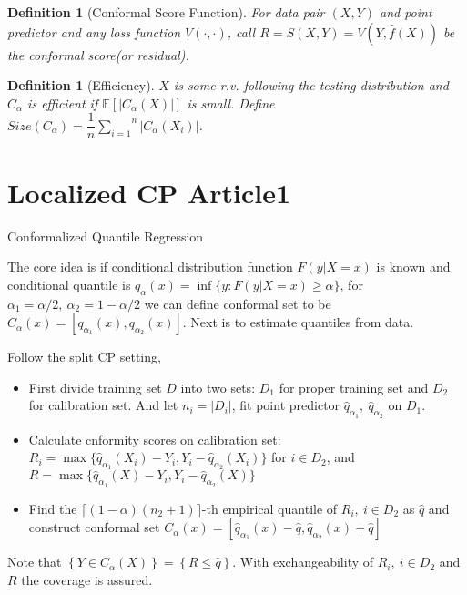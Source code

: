 \documentclass[12pt, a4paper, oneside]{article}
\newtheorem{definition}[theorem]{Definition}
\begin{document}
    \begin{definition}[Conformal Score Function]
        For data pair $(X,Y)$ and point predictor and any loss function $V(\cdot,\cdot)$, call $R=S(X,Y)=V(Y,\hat{f}(X))$ be the conformal score(or residual).
    \end{definition}


    \begin{definition}[Efficiency]
        $X$ is some r.v. following the testing distribution and $C_\alpha$ is efficient if $\mathbb{E}\left[ |C_\alpha(X)| \right]$ is small. Define $Size(C_\alpha)=\dfrac{1}{n}\overset{n}{\underset{i=1}\sum}|C_\alpha(X_i)|$.
    \end{definition}


\section{Localized CP Article1}
    Conformalized Quantile Regression
    \cite{romano2019conformalized}


    The core idea is if conditional distribution function $F(y|X=x)$ is known and conditional quantile is $q_\alpha(x)=\inf\{y:F(y|X=x)\geq\alpha\}$, for $\alpha_1=\alpha/2,\ \alpha_2=1-\alpha/2$ we can define conformal set to be $C_\alpha(x)=\left[ q_{\alpha_1}(x),q_{\alpha_2}(x) \right]$. Next is to estimate quantiles from data.


    Follow the split CP setting, 
    \begin{itemize}
        \item First divide training set $D$ into two sets: $D_1$ for proper training set and $D_2$ for calibration set. And let $n_i=|D_i|$, fit point predictor $\hat{q}_{\alpha_1},\ \hat{q}_{\alpha_2}$ on $D_1$.
        \item Calculate cnformity scores on calibration set: $R_i=\max\{\hat{q}_{\alpha_1}(X_i)-Y_i,Y_i-\hat{q}_{\alpha_2}(X_i)\}$ for $i\in D_2$, and $R=\max\{\hat{q}_{\alpha_1}(X)-Y_i,Y_i-\hat{q}_{\alpha_2}(X)\}$
        \item Find the $\lceil(1-\alpha)(n_2+1)\rceil$-th empirical quantile of $R_i,\ i\in D_2$ as $\hat{q}$ and construct conformal set $C_\alpha(x)=\left[ \hat{q}_{\alpha_1}(x)-\hat{q},\hat{q}_{\alpha_2}(x)+\hat{q} \right]$
    \end{itemize}
    Note that $\left\{ Y\in C_\alpha(X) \right\}=\left\{ R\leq\hat{q} \right\}$. With exchangeability of $R_i,\ i\in D_2$ and $R$ the coverage is assured.
\newpage


\end{document}
